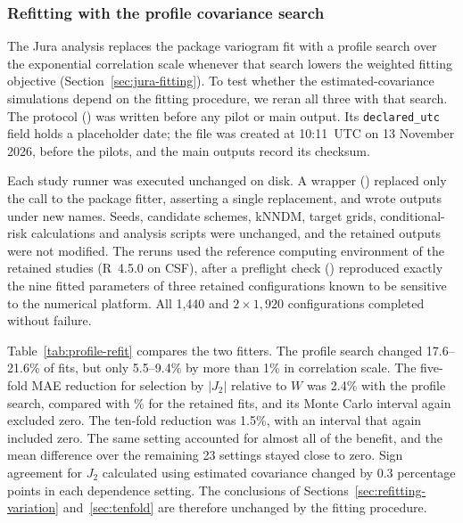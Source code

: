 \documentclass[11pt,a4paper]{article}
\begin{document}
\subsubsection{Refitting with the profile covariance search}
\label{sec:profile-refits}
The Jura analysis replaces the package variogram fit with a profile search over the exponential correlation scale whenever that search lowers the weighted fitting objective (Section~\ref{sec:jura-fitting}). To test whether the estimated-covariance simulations depend on the fitting procedure, we reran all three with that search. The protocol () was written before any pilot or main output. Its \texttt{declared\_utc} field holds a placeholder date; the file was created at 10:11~UTC on 13 November 2026, before the pilots, and the main outputs record its checksum.

Each study runner was executed unchanged on disk. A wrapper () replaced only the call to the package fitter, asserting a single replacement, and wrote outputs under new names. Seeds, candidate schemes, kNNDM, target grids, conditional-risk calculations and analysis scripts were unchanged, and the retained outputs were not modified. The reruns used the reference computing environment of the retained studies (R~4.5.0 on CSF), after a preflight check () reproduced exactly the nine fitted parameters of three retained configurations known to be sensitive to the numerical platform. All 1,440 and $2\times1{,}920$ configurations completed without failure.

Table~\ref{tab:profile-refit} compares the two fitters. The profile search changed 17.6--21.6\% of fits, but only 5.5--9.4\% by more than 1\% in correlation scale. The five-fold MAE reduction for selection by $|J_2|$ relative to $W$ was 2.4\% with the profile search, compared with \NestedReduction\% for the retained fits, and its Monte Carlo interval again excluded zero. The ten-fold reduction was 1.5\%, with an interval that again included zero. The same setting accounted for almost all of the benefit, and the mean difference over the remaining 23 settings stayed close to zero. Sign agreement for $J_2$ calculated using estimated covariance changed by 0.3 percentage points in each dependence setting. The conclusions of Sections~\ref{sec:refitting-variation} and~\ref{sec:tenfold} are therefore unchanged by the fitting procedure.
\end{document}
